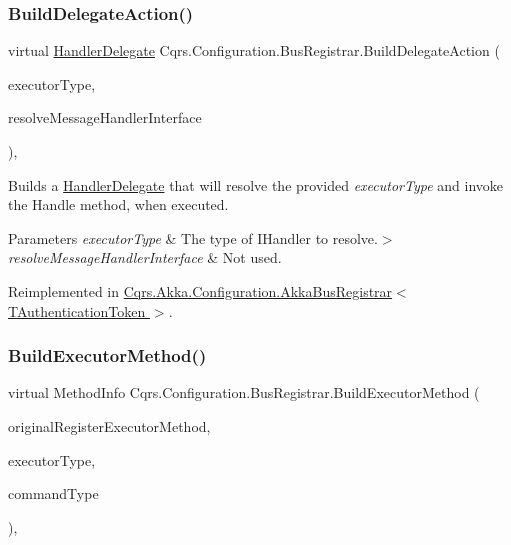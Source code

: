 \subsubsection{\texorpdfstring{Build\+Delegate\+Action()}{BuildDelegateAction()}}
{\footnotesize\ttfamily virtual \hyperlink{classCqrs_1_1Configuration_1_1HandlerDelegate}{Handler\+Delegate} Cqrs.\+Configuration.\+Bus\+Registrar.\+Build\+Delegate\+Action (\begin{DoxyParamCaption}\item[{Type}]{executor\+Type,  }\item[{Func$<$ Type, I\+Enumerable$<$ Type $>$$>$}]{resolve\+Message\+Handler\+Interface }\end{DoxyParamCaption})\hspace{0.3cm}{\ttfamily [protected]}, {\ttfamily [virtual]}}



Builds a \hyperlink{classCqrs_1_1Configuration_1_1HandlerDelegate}{Handler\+Delegate} that will resolve the provided {\itshape executor\+Type}  and invoke the Handle method, when executed. 


\begin{DoxyParams}{Parameters}
{\em executor\+Type} & The type of I\+Handler to resolve.$>$\\
\hline
{\em resolve\+Message\+Handler\+Interface} & Not used.\\
\hline
\end{DoxyParams}


Reimplemented in \hyperlink{classCqrs_1_1Akka_1_1Configuration_1_1AkkaBusRegistrar_ad7e3e5d332d5b4d781375a28f23bdb19_ad7e3e5d332d5b4d781375a28f23bdb19}{Cqrs.\+Akka.\+Configuration.\+Akka\+Bus\+Registrar$<$ T\+Authentication\+Token $>$}.

\mbox{\label{classCqrs_1_1Configuration_1_1BusRegistrar_a03ecf12389b8f55b75c887e113520ac7_a03ecf12389b8f55b75c887e113520ac7}} 
\subsubsection{\texorpdfstring{Build\+Executor\+Method()}{BuildExecutorMethod()}}
{\footnotesize\ttfamily virtual Method\+Info Cqrs.\+Configuration.\+Bus\+Registrar.\+Build\+Executor\+Method (\begin{DoxyParamCaption}\item[{Method\+Info}]{original\+Register\+Executor\+Method,  }\item[{Type}]{executor\+Type,  }\item[{Type}]{command\+Type }\end{DoxyParamCaption})\hspace{0.3cm}{\ttfamily [protected]}, {\ttfamily [virtual]}}



